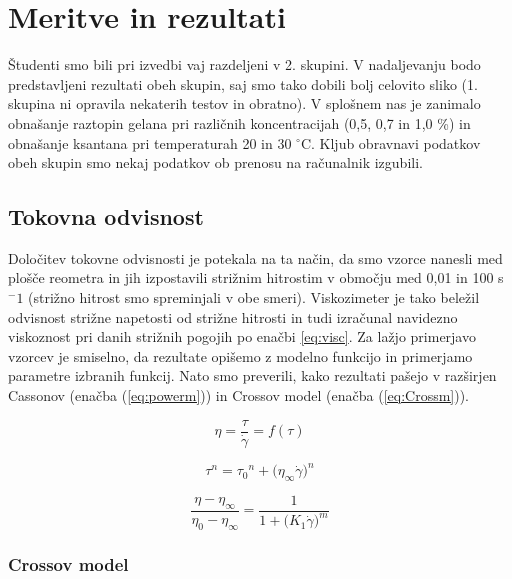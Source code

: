 \documentclass{article}
\begin{document}
\section{Meritve in rezultati} \label{pog:mer}

Študenti smo bili pri izvedbi vaj razdeljeni v 2. skupini. V nadaljevanju bodo predstavljeni rezultati obeh skupin, saj smo tako dobili bolj celovito sliko (1. skupina ni opravila nekaterih testov in obratno). V splošnem nas je zanimalo obnašanje raztopin gelana pri različnih koncentracijah (0,5, 0,7 in 1,0 \%) in obnašanje ksantana pri temperaturah 20 in 30 $^\circ$C. Kljub obravnavi podatkov obeh skupin smo nekaj podatkov ob prenosu na računalnik izgubili.

\subsection{Tokovna odvisnost}

Določitev tokovne odvisnosti je potekala na ta način, da smo vzorce nanesli med plošče reometra in jih izpostavili strižnim hitrostim v območju med 0,01 in 100 s$^-1$ (strižno hitrost smo spreminjali v obe smeri). Viskozimeter je tako beležil odvisnost strižne napetosti od strižne hitrosti in tudi izračunal navidezno viskoznost pri danih strižnih pogojih po enačbi \ref{eq:visc}. Za lažjo primerjavo vzorcev je smiselno, da rezultate opišemo z modelno funkcijo in primerjamo parametre izbranih funkcij. Nato smo preverili, kako rezultati pašejo v razširjen Cassonov (enačba (\ref{eq:powerm})) in Crossov model (enačba (\ref{eq:Crossm})).

\begin{equation} \label{eq:visc}
\eta = \frac{\tau}{\dot{\gamma}} = f(\tau)
\end{equation}

\begin{equation} \label{eq:powerm}
\tau^n = {\tau_0}^n + \Big(\eta_\infty\dot{\gamma}\Big)^n
\end{equation}

\begin{equation} \label{eq:Crossm}
\frac{\eta - \eta_{\infty}}{\eta_0 - \eta_{\infty}} = \frac{1}{1 + \Big(K_1\dot{\gamma}\Big)^m}
\end{equation}

\subsubsection{Crossov model}
\end{document}
